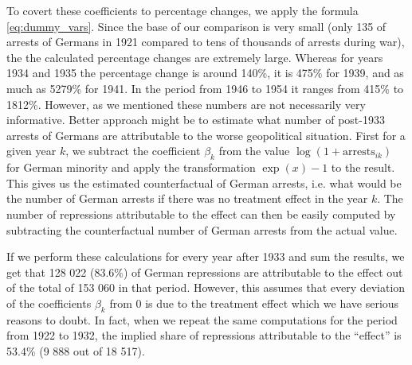 To covert these coefficients to percentage changes, we apply the formula \ref{eq:dummy_vars}. Since the base of our comparison is very small (only 135 of arrests of Germans in 1921 compared to tens of thousands of arrests during war), the the calculated percentage changes are extremely large. 
Whereas for years 1934 and 1935 the percentage change is around 140\%, it is 475\% for 1939, and as much as 5279\% for 1941. In the period from 1946 to 1954 it ranges from 415\% to 1812\%. However, as we mentioned these numbers are not necessarily very informative.
Better approach might be to estimate what number of post-1933 arrests of Germans are attributable to the 
worse geopolitical situation. 
First for a given year $k$, we subtract the coefficient $\beta_k$ from the value  $\log\left(1 + \text{arrests}_{ik}\right)$ for German minority and apply the transformation $\exp\left(x\right) - 1$ to the result. %
This gives us the estimated counterfactual of German arrests, i.e. what would be the number of German arrests if there was no treatment effect in the year $k$. The number of repressions attributable to the effect can then be easily computed by subtracting the counterfactual number  of German arrests  from the actual value.

If we perform these calculations for every year after 1933 and sum the results, we get that  128 022 (83.6\%) of German repressions are attributable to the effect out of the total of 153 060 in that period. 
However, this assumes that every deviation of the coefficients $\beta_k$ from 0 is due to the treatment effect which we have serious reasons to doubt. 
In fact, when we repeat the same computations  for the period from 1922 to 1932, the implied share of repressions attributable to the \enquote{effect} is 53.4\% (9 888 out of 18 517).


%

